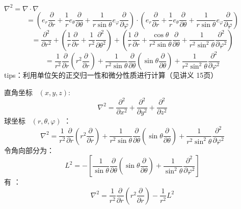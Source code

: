\begin{frame}
	$	\nabla ^2= 	\nabla \cdot \nabla $\\
	\begin{equation*}
		=(e_{r} \frac{\partial}{\partial r}+\frac{1}{r} e_{\theta} \frac{\partial}{\partial \theta}+\frac{1}{r \sin \theta} e_{\varphi} \frac{\partial}{\partial \varphi})  \cdot (e_{r} \frac{\partial}{\partial r}+\frac{1}{r} e_{\theta} \frac{\partial}{\partial \theta}+\frac{1}{r \sin \theta} e_{\varphi} \frac{\partial}{\partial \varphi}) 
	\end{equation*}
	\begin{equation*}
		= \frac{\partial ^2}{\partial r^2} + ( \frac{1}{r} \frac{\partial}{\partial r} + \frac{1}{r^2} \frac{\partial^2} {\partial \theta ^2}  ) + (\frac{1}{r} \frac{\partial}{\partial r}  + \frac{\cos \theta}{r^2 \sin \theta} \frac{\partial} {\partial \theta }  + \frac{1}{r^2 \sin^2 \theta  } \frac{\partial^2}{\partial\varphi ^2} )
	\end{equation*}
	\begin{equation*}
		=\frac{1}{r^2} \frac{\partial }{\partial r} (r^2\frac{\partial }{\partial r} )+
		\frac{1}{r^2 \sin \theta  } \frac{\partial }{\partial \theta } (\sin \theta \frac{\partial }{\partial \theta } )
		+\frac{1}{r^2 \sin^2 \theta  } \frac{\partial^2}{\partial\varphi ^2}
	\end{equation*}
	tips：利用单位矢的正交归一性和微分性质进行计算（见讲义 15页）
\end{frame}	

\begin{frame}
	直角坐标~ $(x,y,z) $: 
	\begin{equation*}
		\nabla ^{2}  = \dfrac{\partial ^2}{\partial x^2} +\dfrac{\partial^2 }{\partial y^2} +\dfrac{\partial^2  }{\partial z^2}
	\end{equation*}
	球坐标~ $	(r,\theta, \varphi )$ ：
	\begin{equation*}
		\nabla ^{2} =\frac{1}{r^2} \frac{\partial }{\partial r} (r^2\frac{\partial }{\partial r} )+
		\frac{1}{r^2 \sin \theta  } \frac{\partial }{\partial \theta } (\sin \theta \frac{\partial }{\partial \theta } )
		+\frac{1}{r^2 \sin^2 \theta  } \frac{\partial^2}{\partial\varphi ^2}
	\end{equation*}	
	令角向部分为：
	\begin{equation*}
		L^2 = - \left[ \frac{1}{ \sin \theta  } \frac{\partial }{\partial \theta } (\sin \theta \frac{\partial }{\partial \theta } )
		+\frac{1}{ \sin^2 \theta  } \frac{\partial^2}{\partial\varphi ^2} \right]
	\end{equation*}	
	有 ：
	\begin{equation*}
		\nabla ^{2} =\frac{1}{r^2} \frac{\partial }{\partial r} (r^2\frac{\partial }{\partial r} )-
		\frac{1}{r^2 } L^2 
	\end{equation*}	
\end{frame}	

